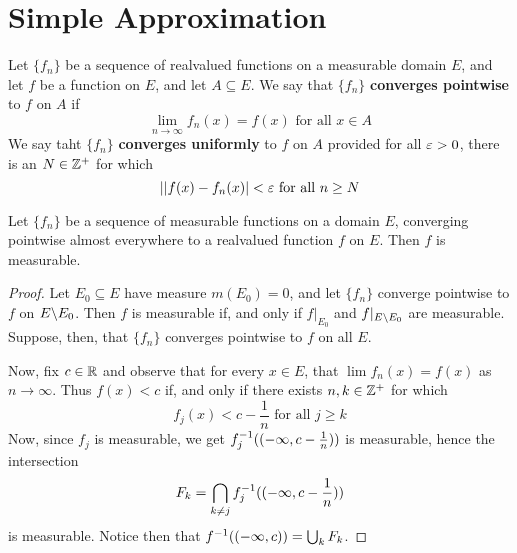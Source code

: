 \section{Simple Approximation}

\begin{definition}
    Let $\{f_n\}$ be a sequence of realvalued functions on a measurable domain
    $E$, and let  $f$ be a function on  $E$, and let  $A \subseteq E$. We say
    that $\{f_n\}$ \textbf{converges pointwise} to $f$ on  $A$ if
    \begin{equation*}
        \lim_{n \xrightarrow{} \infty}{f_n(x)}=f(x) \text{ for all } x \in A
    \end{equation*}
    We say taht $\{f_n\}$ \textbf{converges uniformly} to $f$ on  $A$ provided
    for all $\varepsilon>0$, there is an  $N \in \mathbb{Z}^+$ for which
    \begin{equation*}
        ||f(x)-f_n(x)|<\varepsilon \text{ for all } n \geq N
    \end{equation*}
\end{definition}

\begin{lemma}\label{9.2.1}
    Let $\{f_n\}$ be a sequence of measurable functions on a domain $E$,
    converging pointwise almost everywhere to a realvalued function  $f$ on $E$.
    Then  $f$ is measurable.
\end{lemma}
\begin{proof}
    Let $E_0 \subseteq E$ have measure $m(E_0)=0$, and let $\{f_n\}$ converge
    pointwise to $f$ on  $E \backslash E_0$. Then $f$ is measurable if, and only if
    $f|_{E_0}$ and $f|_{E \backslash E_0}$ are measurable. Suppose, then, that
    $\{f_n\}$ converges pointwise to $f$ on all  $E$.

    Now, fix $c \in \mathbb{R}$ and observe that for every  $x \in E$, that
    $\lim{f_n(x)}=f(x)$ as $n \xrightarrow{} \infty$. Thus  $f(x)<c$ if, and
    only if there exists $n,k \in \mathbb{Z}^+$ for which
    \begin{equation*}
        f_j(x)<c-\frac{1}{n} \text{ for all } j \geq k
    \end{equation*}
    Now, since $f_j$ is measurable, we get  $f_j^{-1}((-\infty,c-\frac{1}{n}))$
    is measurable, hence the intersection
    \begin{equation*}
        F_k=\bigcap_{k \neq j}{f_j^{-1}((-\infty,c-\frac{1}{n}))}
    \end{equation*}
    is measurable. Notice then that $f^{-1}((-\infty,c))=\bigcup_{k}{F_k}$.
\end{proof}

